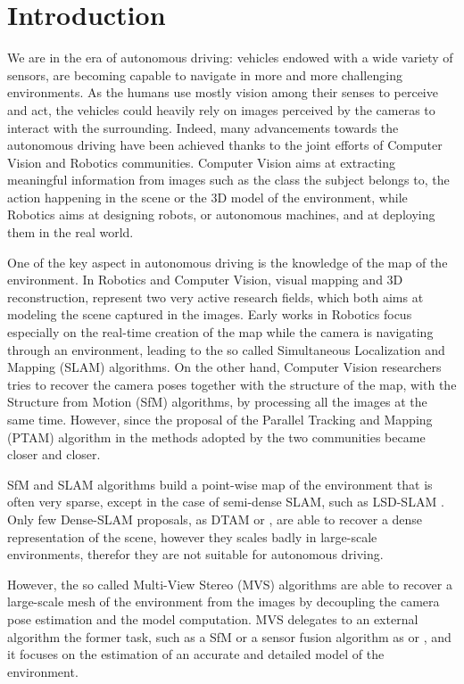 
\chapter{Introduction}
\label{sec:intro}
We are in the era of autonomous driving: vehicles endowed with a wide variety of sensors, are becoming  capable to navigate in more and more challenging environments.
As the humans use mostly vision among their senses to perceive and act, the vehicles could heavily rely on images perceived by the cameras to interact with the surrounding.
Indeed, many advancements towards the autonomous driving have been achieved thanks to the joint efforts of Computer Vision and Robotics communities.
Computer Vision aims at extracting meaningful information from images such as the class the subject belongs to, the action happening in the scene or the 3D model of the environment, while Robotics aims at designing robots, or autonomous machines, and at deploying them in the real world.

One of the key aspect in autonomous driving is the knowledge of the map of the environment. 
In Robotics and Computer Vision, visual mapping and 3D reconstruction, represent two very active research fields, which both aims at modeling the scene captured in the images.
Early works in Robotics focus especially on the real-time creation of the map while the camera is navigating through an environment, leading to the so called Simultaneous Localization and Mapping (SLAM) algorithms. 
On the other hand, Computer Vision researchers tries to recover the  camera poses together with the structure of the map, with the Structure from Motion (SfM) algorithms, by processing all the images at the same time.
However, since the proposal of the Parallel Tracking and Mapping (PTAM) algorithm in \cite{klein_murray07} the methods adopted by the two communities became closer and closer.

SfM and SLAM algorithms build a point-wise map of the environment that is often very sparse, except in the case of semi-dense SLAM, such as LSD-SLAM \cite{engel2014lsd}. 
Only few Dense-SLAM proposals, as DTAM \cite{newcombe2011dtam} or \cite{newcombe2010live}, are able to recover a dense representation of the scene, however they scales badly in large-scale environments, therefor they are not suitable for autonomous driving.

However, the so called Multi-View Stereo (MVS) algorithms are able to recover a large-scale mesh of the environment from the images by decoupling the camera pose estimation and the model computation. 
MVS delegates to an external algorithm the former task, such as a SfM or a sensor fusion algorithm as \cite{mouragnon_et_al07} or \cite{cucci_matteucci13}, and it focuses on the estimation of an accurate and detailed model of the environment.




